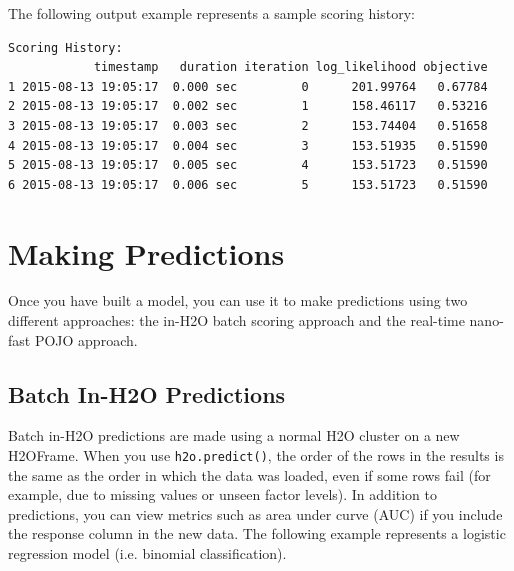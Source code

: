 The following output example represents a sample scoring history: 


\waterExampleInPython

\begin{lstlisting}[style=output]
Scoring History:
            timestamp   duration iteration log_likelihood objective
1 2015-08-13 19:05:17  0.000 sec         0      201.99764   0.67784
2 2015-08-13 19:05:17  0.002 sec         1      158.46117   0.53216
3 2015-08-13 19:05:17  0.003 sec         2      153.74404   0.51658
4 2015-08-13 19:05:17  0.004 sec         3      153.51935   0.51590
5 2015-08-13 19:05:17  0.005 sec         4      153.51723   0.51590
6 2015-08-13 19:05:17  0.006 sec         5      153.51723   0.51590
\end{lstlisting}




\section{Making Predictions}

Once you have built a model, you can use it to make predictions using two different approaches:  the in-H2O batch scoring approach and the real-time nano-fast POJO approach.

\subsection{Batch In-H2O Predictions}

Batch in-H2O predictions are made using a normal H2O cluster on a new H2OFrame.  When you use \texttt{h2o.predict()}, the order of the rows in the results is the same as the order in which the data was loaded, even if some rows fail (for example, due to missing values or unseen factor levels). 
In addition to predictions, you can view metrics such as area under curve (AUC) if you include the response column in the new data.  The following example represents a logistic regression model (i.e. binomial classification).

\waterExampleInR




